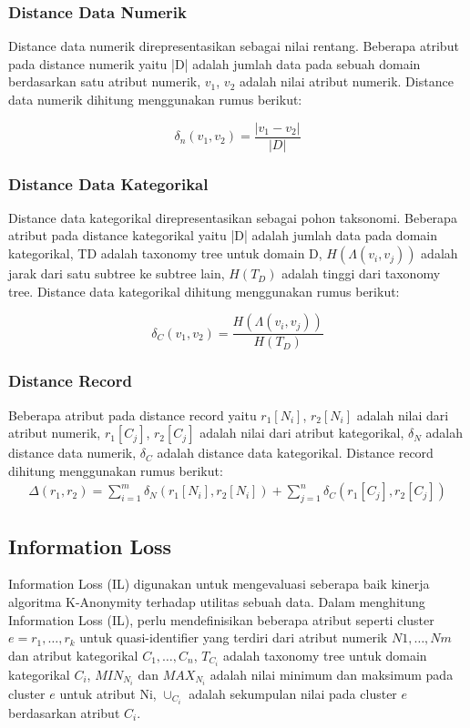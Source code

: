 \subsubsection{Distance Data Numerik}
Distance data numerik direpresentasikan sebagai nilai rentang. Beberapa atribut pada distance numerik yaitu |D| adalah jumlah data pada sebuah domain berdasarkan satu atribut numerik, $v_1$, $v_2$ adalah nilai atribut numerik. Distance data numerik dihitung menggunakan rumus berikut:

\begin{equation}
\delta_n(v_1,v_2) = \frac{|v_1 - v_2|}{|D|} 
\end{equation}

\subsubsection{Distance Data Kategorikal}
Distance data kategorikal direpresentasikan sebagai pohon taksonomi. Beberapa atribut pada distance kategorikal yaitu |D| adalah jumlah data pada domain kategorikal, TD adalah taxonomy tree untuk domain D,  $H(\Lambda(v_i,v_j))$ adalah jarak dari satu subtree ke subtree lain, $H(T_D)$ adalah tinggi dari taxonomy tree. Distance data kategorikal dihitung menggunakan rumus berikut:

\begin{equation}
\delta_C(v_1,v_2) = \frac{H(\Lambda(v_i,v_j))}{H(T_D)} 
\end{equation}

\subsubsection{Distance Record}
Beberapa atribut pada distance record yaitu $r_1[N_i]$, $r_2[N_i]$ adalah nilai dari atribut numerik, $r_1[C_j]$, $r_2[C_j]$ adalah nilai dari atribut kategorikal, $\delta_N$ adalah distance data numerik, $\delta_C$ adalah distance data kategorikal. Distance record dihitung menggunakan rumus berikut:
\begin{align}
\Delta (r_1,r_2) = \sum_{i=1}^{m} \delta_N(r_1[N_i],r_2	[N_i]) +  \sum_{j=1}^{n} \delta_C(r_1[C_j],r_2[C_j])
\end{align}


\subsection{Information Loss}
Information Loss (IL) digunakan untuk mengevaluasi seberapa baik kinerja algoritma K-Anonymity terhadap utilitas sebuah data. Dalam menghitung Information Loss (IL), perlu mendefinisikan beberapa atribut seperti cluster $e = {r_1,\ldots,r_k}$  untuk quasi-identifier yang terdiri dari atribut numerik ${N1,\ldots, Nm}$ dan atribut kategorikal ${C_1,\ldots,C_n}$, $T_{C_i}$ adalah taxonomy tree untuk domain kategorikal $C_i$, $MIN_{N_i}$ dan $MAX_{N_i}$ adalah nilai minimum dan maksimum pada cluster $e$ untuk atribut Ni, $\cup_{C_i}$ adalah sekumpulan nilai pada cluster $e$ berdasarkan atribut $C_i$. \\

